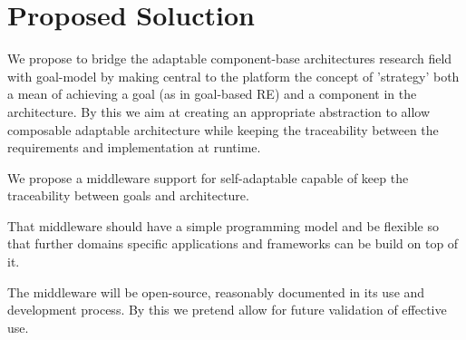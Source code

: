 \section{Proposed Soluction}

We propose to bridge the adaptable component-base architectures research field with goal-model by making central to the platform the concept of 'strategy' both a mean of achieving a goal (as in goal-based RE) and a component in the architecture. By this we aim at creating an appropriate abstraction to allow composable adaptable architecture while keeping the traceability between the requirements and implementation at runtime.

We propose a middleware support for self-adaptable capable of keep the traceability between goals and architecture.

That middleware should have a simple programming model and be flexible so that further domains specific applications and frameworks can be build on top of it.

The middleware will be open-source, reasonably documented in its use and development process. By this we pretend allow for future validation of effective use.

\begin{comment}

Finally we explore how to use the middleware support for development of distributed, open-adaptable, opportunistic and evolvable application.

As a support for open-systems, we propose a multi-agent approach in witch agents can collaborate by making peer agents 'strategies' discoverable.

\begin{figure}
  \centering
  \texttt{[image: goalp-agent-repo-rcm-depl]}
  \caption{The proposed agent composition}
  \label{fig:agent_composition}
\end{figure}

We followend an approach with run-time goal model with an mechanism for compositional adaptation and multi-agent collaboration. In our propose adaptiveness is achived by means of strategies matching an selection at runtime. For more flexibility we propose a symetric design.

By composable simetry we mean that we should be able to compose strategies in new strategies, and made agents out of strategies and teams out of agents. All with the same interface, transparent for a peer client.

\end{comment}

